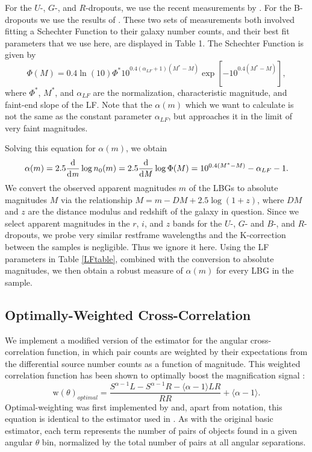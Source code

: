 For the $U$-, $G$-, and $R$-dropouts, we use the recent measurements by \citet{vanderBurg10}. For the B-dropouts we use the results of \citet{Sawicki06}. These two sets of measurements both involved fitting a Schechter Function \citep{Schechter76} to their galaxy number counts, and their best fit parameters that we use here, are displayed in Table 1.  The Schechter Function is given by
\begin{equation}
\Phi(M)=0.4\ln(10)\Phi^\ast10^{0.4(\alpha_{LF}+1)(M^\ast-M)} \exp [-10^{0.4(M^\ast-M)}],
\end{equation}
where $\Phi^\ast$, $M^\ast$, and $\alpha_{LF}$ are the normalization, characteristic magnitude, and faint-end slope of the LF.  Note that the $\alpha(m)$ which we want to calculate is not the same as the constant parameter $\alpha_{LF}$, but approaches it in the limit of very faint magnitudes.

Solving this equation for $\alpha(m)$, we obtain
\begin{equation}
\alpha(m) = 2.5 \frac{\mathrm d}{\mathrm d \it m} \log n_0(m)= 2.5 \frac{\mathrm d}{\mathrm d \it M} \log \Phi(M) = 10^{0.4(M^\ast-M)}-\alpha_{LF}-1.
\end{equation}
We convert the observed apparent magnitudes $m$ of the LBGs to absolute magnitudes $M$ via the relationship $M = m - DM + 2.5 \log (1+z)$, where $DM$ and $z$ are the distance modulus and redshift of the galaxy in question. Since we select apparent magnitudes in the $r$, $i$, and $z$ bands for the $U$-, $G$- and $B$-, and $R$-dropouts, we probe very similar restframe wavelengths and the K-correction between the samples is negligible.  Thus we ignore it here. Using the LF parameters in Table \ref{LFtable}, combined with the conversion to absolute magnitudes, we then obtain a robust measure of $\alpha(m)$ for every LBG in the sample. 

\subsection{Optimally-Weighted Cross-Correlation}
We implement a modified version of the \citet{LandySzalay93} estimator for the angular cross-correlation function, in which pair counts are weighted by their expectations from the differential source number counts as a function of magnitude.  This weighted correlation function has been shown to optimally boost the magnification signal \citep{Menard03}:    
\begin{equation}
\mathrm{w}(\theta)_{optimal}=\frac{S^{\alpha-1} L - S^{\alpha-1} R - \langle \alpha-1 \rangle LR}{RR} + \langle \alpha-1 \rangle .
\end{equation}
Optimal-weighting was first implemented by \citet{Scranton05} and, apart from notation, this equation is identical to the estimator used in \citet{Hildebrandt09b}.  As with the original basic estimator, each term represents the number of pairs of objects found in a given angular $\theta$ bin, normalized by the total number of pairs at all angular separations.  

